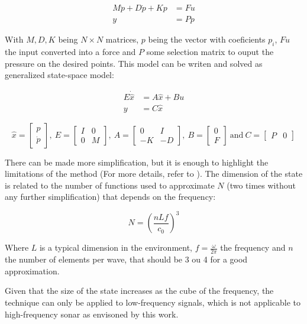 \begin{align*}
M\ddot{p} + D\dot{p} + Kp &= Fu \\
y &= Pp
\end{align*}

With \(M,D,K\) being \(N \times N \) matrices, $p$ being the vector with
coeficients $p_i$, $Fu$ the input converted into a force and $P$ some selection
matrix to ouput the pressure on the desired points. This model can be writen and
solved as generalized state-space model:

\begin{align*}
E\dot{\hat{x}} &= A\hat{x} + Bu \\
y &= C\hat{x}
\end{align*}

\[
\hat{x} =
  \begin{bmatrix}
    p \\
    \dot{p}
  \end{bmatrix},~
E =
  \begin{bmatrix}
    I & 0 \\
    0 & M
  \end{bmatrix},~
A =
  \begin{bmatrix}
    0 & I \\
    -K & -D
  \end{bmatrix},~
B =
  \begin{bmatrix}
    0 \\
    F
  \end{bmatrix}
  ~
  \text{and}
  ~
C =
  \begin{bmatrix}
    P & 0 
  \end{bmatrix}
\]
 
 There can be made more simplification, but it is enough to highlight the
 limitations of the method (For more details, refer to
 \citet{deines2006comparative}). The dimension of the state is related to
 the number of functions used to approximate $N$ (two times without any further
 simplification) that depends on the frequency:
 
 \[N = \left(\frac{nLf}{c_0}\right)^3 \]
 
 Where $L$ is a typical dimension in the environment, $f = \frac{\omega}{2\pi}$
 the frequency and $n$ the number of elements per wave, that should be 3 ou 4
 for a good approximation\cite{deines2006comparative}.
 
 Given that the size of the state increases as the cube of the frequency, the
 technique can only be applied to low-frequency signals, which is not applicable
 to high-frequency sonar as envisoned by this work. 

